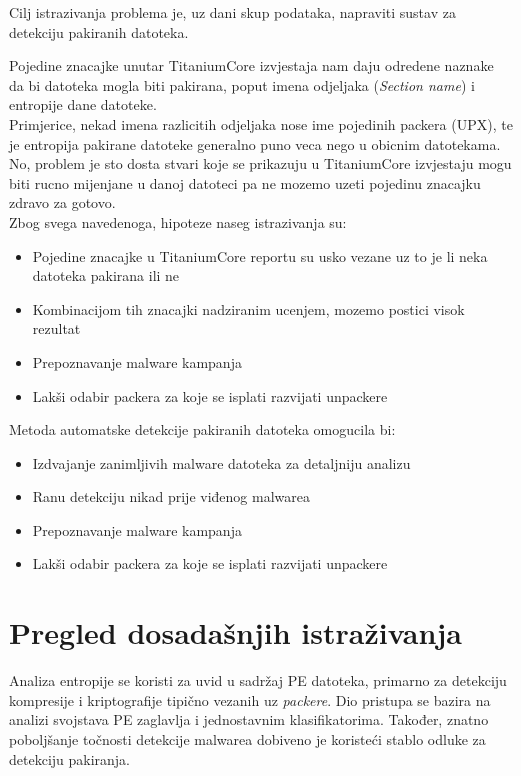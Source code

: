 \documentclass[paper=a4, fontsize=11pt]{scrartcl} %
\numberwithin{equation}{section} %
\numberwithin{figure}{section} %
\numberwithin{table}{section} %
\begin{document}
Cilj istrazivanja problema je, uz dani skup podataka, napraviti sustav za detekciju pakiranih datoteka.

\vspace{3mm}

Pojedine znacajke unutar TitaniumCore izvjestaja nam daju odredene naznake da bi datoteka mogla biti pakirana, poput imena odjeljaka (\textit{Section name}) i entropije dane datoteke.\\
Primjerice, nekad imena razlicitih odjeljaka nose ime pojedinih packera (UPX), te je entropija pakirane datoteke generalno puno veca nego u obicnim datotekama.\\
No, problem je sto dosta stvari koje se prikazuju u TitaniumCore izvjestaju mogu biti rucno mijenjane u danoj datoteci pa ne mozemo uzeti pojedinu znacajku zdravo za gotovo.\\
Zbog svega navedenoga, hipoteze naseg istrazivanja su:

\begin{itemize}
\item Pojedine znacajke u TitaniumCore reportu su usko vezane uz to je li neka datoteka pakirana ili ne
\item Kombinacijom tih znacajki nadziranim ucenjem, mozemo postici visok rezultat 
\item Prepoznavanje malware kampanja
\item Lakši odabir packera za koje se isplati razvijati unpackere
\end{itemize}

\vspace{3mm}

Metoda automatske detekcije pakiranih datoteka omogucila bi:

\begin{itemize}
\item Izdvajanje zanimljivih malware datoteka za detaljniju analizu
\item Ranu detekciju nikad prije viđenog malwarea
\item Prepoznavanje malware kampanja
\item Lakši odabir packera za koje se isplati razvijati unpackere
\end{itemize}

\section{Pregled dosadašnjih istraživanja}

Analiza entropije se koristi za uvid u sadržaj PE datoteka, primarno za detekciju kompresije i kriptografije tipično vezanih uz \textit{packere}.
Dio pristupa se bazira na analizi svojstava PE zaglavlja i jednostavnim klasifikatorima. Također, znatno poboljšanje točnosti detekcije malwarea dobiveno je koristeći stablo odluke za detekciju pakiranja.
\end{document}
